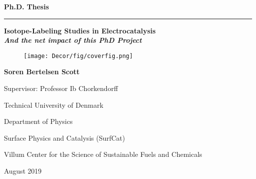 
\begin{titlepage}



\begin{center}
\parindent=0pt
\flushleft

\newcommand{\HRule}{\rule{\textwidth}{1mm}}

\Large{\textbf{Ph.D. Thesis}}

\HRule

\vspace{3mm}
\LARGE{\textbf{Isotope-Labeling Studies in Electrocatalysis}}\\

\vspace{3mm}
\large{\textit{\textbf{And the net  impact of this PhD Project}}}


\end{center}

\vfill

\begin{figure}[h!]
	\begin{center}
	\advance\leftskip-1cm
	\texttt{[image: Decor/fig/coverfig.png]}	
	\end{center}
\end{figure}

\vfill
\noindent
\parindent=0pt
\Large{\textbf{Soren Bertelsen Scott}}

\vspace{5mm}

Supervisor: Professor Ib Chorkendorff

Technical University of Denmark

Department of Physics

Surface Physics and Catalysis (SurfCat)

Villum Center for the Science of Sustainable Fuels and Chemicals

\vspace{5mm}

August 2019
\end{titlepage}